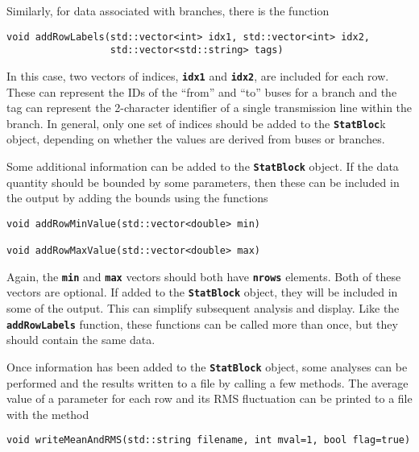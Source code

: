 Similarly, for data associated with branches, there is the function

{
\color{red}
\begin{Verbatim}[fontseries=b]
void addRowLabels(std::vector<int> idx1, std::vector<int> idx2,
                  std::vector<std::string> tags)
\end{Verbatim}
}

In this case, two vectors of indices, \texttt{\textbf{idx1}} and \texttt{\textbf{idx2}}, are included for each row. These can represent the IDs of the ``from'' and ``to'' buses for a branch and the tag can represent the 2-character identifier of a single transmission line within the branch. In general, only one set of indices should be added to the \texttt{\textbf{StatBloc}}k object, depending on whether the values are derived from buses or branches.

Some additional information can be added to the \texttt{\textbf{StatBlock}} object. If the data quantity should be bounded by some parameters, then these can be included in the output by adding the bounds using the functions

{
\color{red}
\begin{Verbatim}[fontseries=b]
void addRowMinValue(std::vector<double> min)

void addRowMaxValue(std::vector<double> max)
\end{Verbatim}
}

Again, the \texttt{\textbf{min}} and \texttt{\textbf{max}} vectors should both have \texttt{\textbf{nrows}} elements. Both of these vectors are optional. If added to the \texttt{\textbf{StatBlock}} object, they will be included in some of the output. This can simplify subsequent analysis and display. Like the \texttt{\textbf{addRowLabels}} function, these functions can be called more than once, but they should contain the same data.

Once information has been added to the \texttt{\textbf{StatBlock}} object, some analyses can be performed and the results written to a file by calling a few methods. The average value of a parameter for each row and its RMS fluctuation can be printed to a file with the method

{
\color{red}
\begin{Verbatim}[fontseries=b]
void writeMeanAndRMS(std::string filename, int mval=1, bool flag=true)
\end{Verbatim}
}

